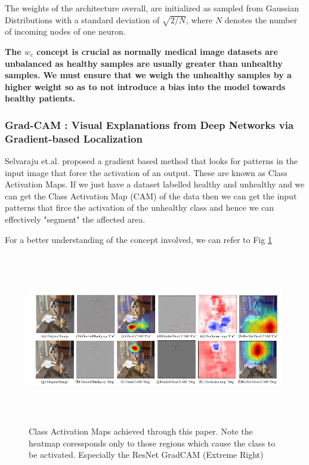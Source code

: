 \documentclass[19pt]{article}
\begin{document}
 The weights of the architecture overall, are initialized as sampled from Gaussian Distributions with a standard deviation of $\sqrt{2/N}$, where $N$ denotes the number of incoming nodes of one neuron.

 \textbf{The $w_c$ concept is crucial as normally medical image datasets are unbalanced as healthy samples are usually greater than unhealthy samples. We must ensure that we weigh the unhealthy samples by a higher weight so as to not introduce a bias into the model towards healthy patients.}

 \subsubsection{Grad-CAM : Visual Explanations from Deep Networks via Gradient-based Localization}

 Selvaraju et.al. \cite{selvaraju2017grad} proposed a gradient based method that looks for patterns in the input image that force the activation of an output. These are known as Class Activation Maps. If we just have a dataset labelled healthy and unhealthy and we can get the Class Activation Map (CAM) of the data then we can get the input patterns that firce the activation of the unhealthy class and hence we can effectively "segment" the affected area.

 For a better understanding of the concept involved, we can refer to Fig \ref{fig:10}

\begin{center}
    \begin{figure}[!h!t!b]
        \centerline{\includegraphics[width=175mm,height=75mm]{images/gradcampap.png}}
        \caption{Class Activation Maps achieved through this paper. Note the heatmap coressponds only to those regions which cause the class to be activated. Especially the ResNet GradCAM (Extreme Right)} 
        \label{fig:10}
    \end{figure}
\end{center}
\end{document}

